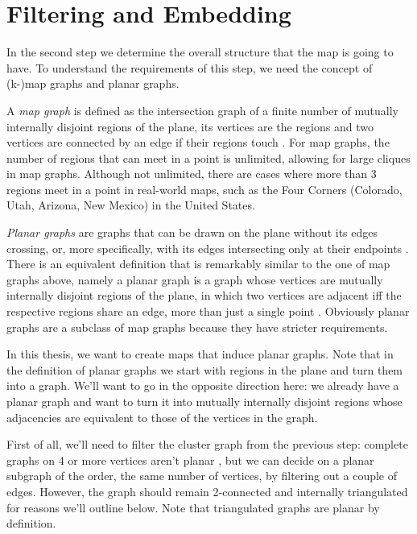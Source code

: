 \section{Filtering and Embedding}
\label{sect:filtering-and-embedding}

In the second step we determine the overall structure that the map is going to have. To understand the requirements of this step, we need the concept of (k-)map graphs and planar graphs.

A \emph{map graph} is defined as the intersection graph of a finite number of mutually internally disjoint regions of the plane, \ie{} its vertices are the regions and two vertices are connected by an edge if their regions touch \cite{chen2002map}. For map graphs, the number of regions that can meet in a point is unlimited, allowing for large cliques in map graphs. Although not unlimited, there are cases where more than 3 regions meet in a point in real-world maps, such as the Four Corners (Colorado, Utah, Arizona, New Mexico) in the United States.

\emph{Planar graphs} are graphs that can be drawn on the plane without its edges crossing, or, more specifically, with its edges intersecting only at their endpoints \cite{wagner2016algorithmen}. There is an equivalent definition that is remarkably similar to the one of map graphs above, namely a planar graph is a graph whose vertices are mutually internally disjoint regions of the plane, in which two vertices are adjacent iff the respective regions share an edge, \ie{} more than just a single point \cite{chen2002map}. Obviously planar graphs are a subclass of map graphs because they have stricter requirements.

In this thesis, we want to create maps that induce planar graphs. Note that in the definition of  planar graphs we start with regions in the plane and turn them into a graph. We'll want to go in the opposite direction here: we already have a planar graph and want to turn it into mutually internally disjoint regions whose adjacencies are equivalent to those of the vertices in the graph.

First of all, we'll need to filter the cluster graph from the previous step: complete graphs on 4 or more vertices aren't planar \cite{wagner2016algorithmen}, but we can decide on a planar subgraph of the order, \ie{} the same number of vertices, by filtering out a couple of edges. However, the graph should remain 2-connected and internally triangulated for reasons we'll outline below. Note that triangulated graphs are planar by definition.

